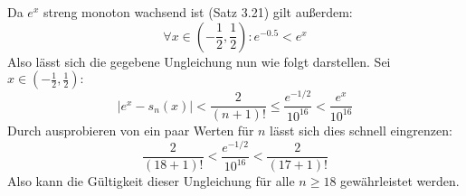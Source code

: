 \documentclass[a4paper,graphics,11pt]{article}
\begin{document}
Da $e^x$ streng monoton wachsend ist (Satz 3.21) gilt außerdem:
$$
    \forall x \in \left(-\frac{1}{2}, \frac{1}{2}\right)\colon e^{-0.5} < e^{x}
$$
Also lässt sich die gegebene Ungleichung nun wie folgt darstellen. Sei $x \in \left(-\frac{1}{2}, \frac{1}{2} \right)\colon$
$$
    |e^x - s_n(x)| < \frac{2}{(n+1)!} \leq \frac{e^{-1/2}}{10^{16}} < \frac{e^x}{10^{16}}
$$
Durch ausprobieren von ein paar Werten für $n$ lässt sich dies schnell eingrenzen:
$$
    \frac{2}{(18+1)!} < \frac{e^{-1/2}}{10^{16}} < \frac{2}{(17+1)!}
$$
Also kann die Gültigkeit dieser Ungleichung für alle $n\geq 18$ gewährleistet werden.
\end{document}
